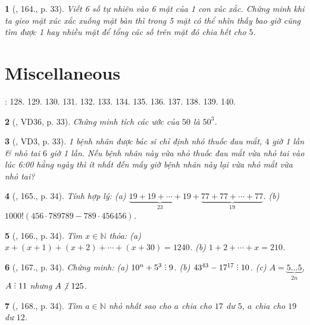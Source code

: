 \documentclass{article}
\newtheorem{baitoan}{}
\DeclareRobustCommand{\divby}{%
	\mathrel{\vbox{\baselineskip.65ex\lineskiplimit0pt\hbox{.}\hbox{.}\hbox{.}}}%
}
\begin{document}
\begin{baitoan}[\cite{Tuyen_Toan_6}, 164., p. 33]
	Viết 6 số tự nhiên vào 6 mặt của 1 con xúc xắc. Chứng minh khi ta gieo mặt xúc xắc xuống mặt bàn thì trong 5 mặt có thể nhìn thấy bao giờ cũng tìm được 1 hay nhiều mặt để tổng các số trên mặt đó chia hết cho $5$.
\end{baitoan}


\section{Miscellaneous}
\cite[BTCCI, pp. 37--38]{SBT_Toan_6_Canh_Dieu_tap_1}: 128. 129. 130. 131. 132. 133. 134. 135. 136. 137. 138. 139. 140.

\begin{baitoan}[\cite{Tuyen_Toan_6}, VD36, p. 33]
	Chứng minh tích các ước của $50$ là $50^3$.
\end{baitoan}

\begin{baitoan}[\cite{Tuyen_Toan_6}, VD3, p. 33]
	1 bệnh nhân được bác sĩ chỉ định nhỏ thuốc đau mắt, $4$ giờ 1 lần \& nhỏ tai $6$ giờ 1 lần. Nếu bệnh nhân này vừa nhỏ thuốc đau mắt vừa nhỏ tai vào lúc {\rm6:00} hằng ngày thì ít nhất đến mấy giờ bệnh nhân này lại vừa nhỏ mắt vừa nhỏ tai?
\end{baitoan}

\begin{baitoan}[\cite{Tuyen_Toan_6}, 165., p. 34]
	Tính hợp lý: (a) $\underbrace{19 + 19 + \cdots + 19}_{23} + \underbrace{77 + 77 + \cdots + 77}_{19}$. (b) $1000!(456\cdot789789 - 789\cdot456456)$.
\end{baitoan}

\begin{baitoan}[\cite{Tuyen_Toan_6}, 166., p. 34]
	Tìm $x\in\mathbb{N}$ thỏa: (a) $x + (x + 1) + (x + 2) + \cdots + (x + 30) = 1240$. (b) $1 + 2 + \cdots + x = 210$.
\end{baitoan}

\begin{baitoan}[\cite{Tuyen_Toan_6}, 167., p. 34]
	Chứng minh: (a) $10^n + 5^3\divby9$. (b) $43^{43} - 17^{17}\divby10$. (c) $A = \underbrace{5\ldots5}_{2n}$, $A\divby11$ nhưng $A\not{\divby}\ 125$.
\end{baitoan}

\begin{baitoan}[\cite{Tuyen_Toan_6}, 168., p. 34]
	Tìm $a\in\mathbb{N}$ nhỏ nhất sao cho $a$ chia cho $17$ dư $5$, $a$ chia cho $19$ dư $12$.
\end{baitoan}
\end{document}
